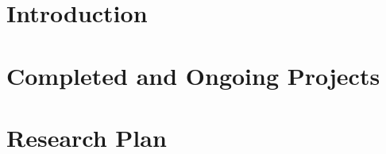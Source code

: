 \documentclass[11pt, a4paper]{report}
\begin{document}
    
    
    \tableofcontents
    \newpage

    \chapter{Introduction}
    
    
    

    \chapter{Completed and Ongoing Projects}
    
    
    
    

    \chapter{Research Plan}
    
    
    
    
    
    
    

    \newpage
    
    
%    
\end{document}
